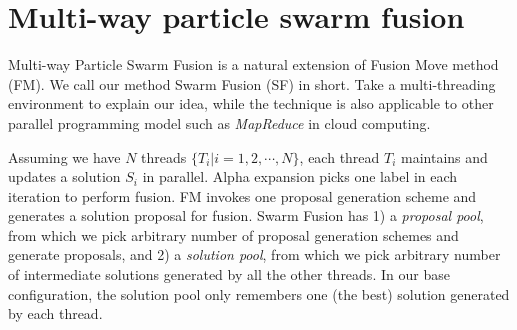 \section{Multi-way particle swarm fusion}
Multi-way Particle Swarm Fusion is a natural extension of Fusion Move
method (FM). We call our method Swarm Fusion (SF) in short. Take a
multi-threading environment to explain our idea, while the technique is
also applicable to other parallel programming model such as {\it
MapReduce} in cloud computing.
%

Assuming we have $N$ threads $\{T_i | i=1, 2, \cdots, N\}$, each thread
$T_i$ maintains and updates a solution $S_i$ in parallel. Alpha
expansion picks one label in each iteration to perform fusion. FM
invokes one proposal generation scheme and generates a solution proposal
for fusion. Swarm Fusion has 1) a {\it proposal pool}, from which we
pick arbitrary number of proposal generation schemes and generate
proposals, and 2) a {\it solution pool}, from which we pick arbitrary
number of intermediate solutions generated by all the other threads.
%
%
In our base configuration, the solution pool only remembers one (the
best) solution generated by each thread.

